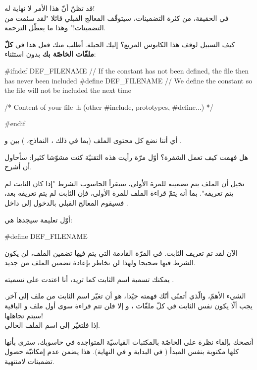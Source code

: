 قد تظنّ أنّ هذا الأمر لا نهاية له!\\
في الحقيقة، من كثرة التضمينات، سيتوقّف المعالج القبلي قائلا "لقد سئمت من التضمينات!" وهذا ما يعطّل الترجمة.

كيف السبيل لوقف هذا الكابوس المريع؟ إليك الحيلة. أطلب منك فعل هذا في
\textbf{كلّ ملفّات
الخاصّة بك} بدون استثناء:

\begin{Csource}
#ifndef DEF_FILENAME // If the constant has not been defined, the file then has never been included
#define DEF_FILENAME // We define the constant so the file will not be included the next time

/* Content of your file .h (other #include, prototypes, #define...) */

#endif
\end{Csource}

أي أننا نضع كل محتوى الملف
(بما في ذلك
،
النماذج،
)
بين 
و .

هل فهمت كيف تعمل الشفرة؟ أوّل مرّة رأيت هذه التقنيّة كنت مشوّشا كثيرا: سأحاول أن أشرح.

تخيل أن الملف
يتم تضمينه للمرة الأولى، سيقرأ الحاسوب الشرط "إذا كان الثابت
لم يتم تعريفه". بما أنه يتمّ قراءة الملف للمرة الأولى، فإن الثابت لم يتم تعريفه بعد، فسيقوم المعالج القبلي بالدخول إلى داخل
.

أوّل تعليمة سيجدها هي:

\begin{Csource}
#define DEF_FILENAME
\end{Csource}

الآن لقد تم تعريف الثابت. في المرّة القادمة التي يتم فيها تضمين الملف، لن يكون الشرط فيها صحيحا ولهذا لن نخاطر بإعادة تضمين الملف من جديد.

يمكنك تسمية اسم الثابت كما تريد، أنا اعتدت على تسميته
.

الشيء الأهمّ، والّذي أتمنّى أنّك فهمته جيّدا، هو أن تغيّر اسم الثابت من ملف
إلى آخر. يجب ألّا يكون نفس الثابت في كلّ ملفّات
،
و إلا فلن تتم قراءة سوى أول ملف
و الباقية سيتم تجاهلها!\\
إذا فلتغيّر
إلى اسم الملف الحالي.
\begin{information}
أنصحك بإلقاء نظرة على
الخاصّة بالمكتبات القياسيّة المتواجدة في حاسوبك، سترى بأنها
كلها
مكتوبة بنفس المبدأ
(
في البداية و
في النهاية). هذا يضمن عدم إمكانيّة حصول تضمينات لامنتهية.
\end{information}

